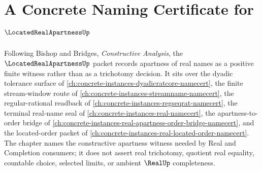 \chapter{A Concrete Naming Certificate for $\LocatedRealApartnessUp$}
\label{ch:concrete-instances-located-real-apartness-namecert}

Following Bishop and Bridges, \emph{Constructive Analysis}, the $\LocatedRealApartnessUp$ packet records apartness of real names as a positive finite witness rather than as a trichotomy decision. It sits over the dyadic tolerance surface of \autoref{ch:concrete-instances-dyadicratcore-namecert}, the finite stream-window route of \autoref{ch:concrete-instances-streamname-namecert}, the regular-rational readback of \autoref{ch:concrete-instances-regseqrat-namecert}, the terminal real-name seal of \autoref{ch:concrete-instances-real-namecert}, the apartness-to-order bridge of \autoref{ch:concrete-instances-real-apartness-order-bridge-namecert}, and the located-order packet of \autoref{ch:concrete-instances-real-located-order-namecert}. The chapter names the constructive apartness witness needed by Real and Completion consumers; it does not assert real trichotomy, quotient real equality, countable choice, selected limits, or ambient $\RealUp$ completeness.

